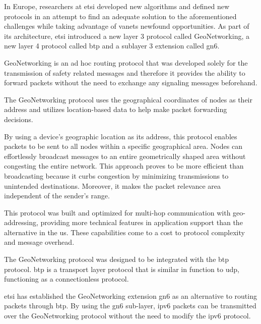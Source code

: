 In Europe, researchers at \gls{etsi} developed new algorithms and defined new protocols in an attempt to find an adequate solution to the aforementioned challenges while taking advantage of \glspl{vanet} newfound opportunities. As part of its architecture, \gls{etsi} introduced a new layer 3 protocol called GeoNetworking\cite{etsi_intelligent_2014-1}\cite{etsi_intelligent_2013-1}\cite{etsi_intelligent_2014}\cite{etsi_intelligent_2020-1}\cite{etsi_intelligent_2019}\cite{etsi_intelligent_2014-2}, a new layer 4 protocol called \gls{btp}\cite{etsi_intelligent_2019} and a sublayer 3 extension called \gls{gn6}\cite{etsi_intelligent_2014-2}.

GeoNetworking is an ad hoc routing protocol that was developed solely for the transmission of safety related messages and therefore it provides the ability to forward packets without the need to exchange any signaling messages beforehand.

The GeoNetworking protocol uses the geographical coordinates of nodes as their address and utilizes location-based data to help make packet forwarding decisions. 

By using a device's geographic location as its address, this protocol enables packets to be sent to all nodes within a specific geographical area. Nodes can effortlessly broadcast messages to an entire geometrically shaped area without congesting the entire network. This approach proves to be more efficient than broadcasting because it curbs congestion by minimizing transmissions to unintended destinations. Moreover, it makes the packet relevance area independent of the sender's range.

This protocol was built and optimized for multi-hop communication with geo-addressing, providing more technical features in application support than the alternative in the \gls{us}. These capabilities come to a cost to protocol complexity and message overhead\cite{festag_standards_2015}.

The GeoNetworking protocol was designed to be integrated with the \gls{btp} protocol. \gls{btp} is a transport layer protocol that is similar in function to \gls{udp}, functioning as a connectionless protocol\cite{festag_cooperative_2014}.

\gls{etsi} has established the GeoNetworking extension \gls{gn6} as an alternative to routing packets through \gls{btp}. By using the \gls{gn6} sub-layer, \gls{ipv6} packets can be transmitted over the GeoNetworking protocol without the need to modify the \gls{ipv6} protocol\cite{festag_cooperative_2014}.


